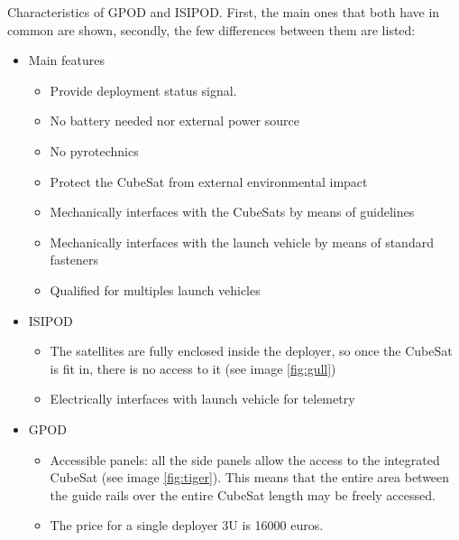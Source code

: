 Characteristics of GPOD and ISIPOD. First, the main ones that both have in common are shown, secondly, the few differences between them are listed:

\begin{itemize}
\item Main features
\begin{itemize}
\item Provide deployment status signal.
\item No battery needed nor external power source
\item No pyrotechnics
\item Protect the CubeSat from external environmental impact
\item Mechanically interfaces with the CubeSats by means of guidelines
\item Mechanically interfaces with the launch vehicle by means of standard fasteners
\item Qualified for multiples launch vehicles
\end{itemize}
\item ISIPOD 
\begin{itemize}
\item The satellites are fully enclosed inside the deployer, so once the CubeSat is fit in, there is no access to it (see image \ref{fig:gull})
\item Electrically interfaces with launch vehicle for telemetry
\end{itemize}
\item GPOD
\begin{itemize}
\item Accessible panels: all the side panels allow the access to the integrated CubeSat (see image \ref{fig:tiger}). This means that the entire area between the guide rails over the entire CubeSat length may be freely accessed. 
\item The price for a single deployer 3U is 16000 euros. 
\end{itemize}
\end{itemize}

